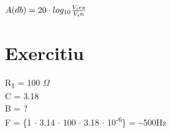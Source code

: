 \documentclass[11pt]{article}
\date{\today}
\title{}
\begin{document}
\tableofcontents

\(A(db) = 20 \cdot log_{10} {V_ies \over V_in}\)
\section{Exercitiu}
\label{sec:org47bd127}
R\textsubscript{1} = 100 \(\Omega\) \\
C = 3.18 \\
B = ? \\

F = \{1  \(\cdot\) 3.14 \(\cdot\) 100 \(\cdot\) 3.18 \(\cdot\) 10\textsuperscript{-6}\} = \textasciitilde{}500Hz
\end{document}
